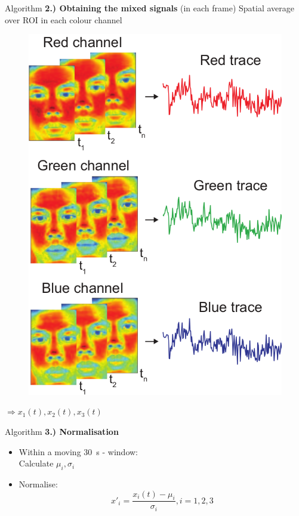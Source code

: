\documentclass{beamer}
\begin{document}
\begin{frame}{Algorithm}
\textbf{\Large 2.) Obtaining the mixed signals} (in each frame)
	Spatial average over ROI in each colour channel
	\begin{figure}
	\includegraphics[height=0.6\paperheight, align=c]{video_to_trace.png}
	\end{figure}
	$\Rightarrow x_1(t), x_2(t), x_3(t)$
\end{frame}

\begin{frame}{Algorithm}
\textbf{\Large 3.) Normalisation}
\begin{itemize}
	\item Within a moving 30~s - window:\\
		Calculate $\mu_i, \sigma_i$ \pause
	\item Normalise:
		\begin{equation*}
			x'_i = \frac{x_i(t) - \mu_i}{\sigma_i}, i = 1, 2, 3
		\end{equation*}
\end{itemize}
\end{frame}
\end{document}
